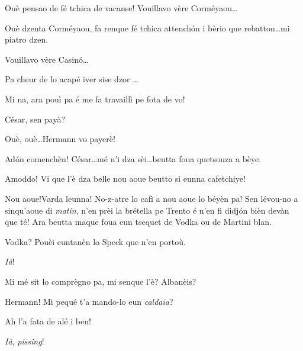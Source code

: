 \begin{drama}
\Peterspeaks{}  Ouè pensao de fé tchica de vacanse! Vouillavo vère Corméyaou\ldots

\Cesarspeaks Ouè dzenta Corméyaou, fa renque fé tchica attench\'on i bèrio que rebatton\ldots mi piatro dzen.

\Peterspeaks Vouillavo vère Casin\'o\ldots

\Cesarspeaks Pa cheur de lo acapé iver sise dzor \ldots

\Peterspeaks Mi na, ara pouì pa é me fa travaillì pe fota de vo!


\Katrinspeaks César, sen payà?

\Cesarspeaks{} Ouè, ouè\ldots Hermann vo payerè!


\Hermannspeaks Ad\'on comenchèn! César\ldots mé n'i dza sèi\ldots beutta foua quetsouza a bèye.

\Cesarspeaks Amoddo! Vi que l'è dza belle nou aoue beutto si eunna cafetchiye!

\Hermannspeaks{} Nou aoue!Varda leunna! No-z-atre lo cafì a nou aoue lo béyèn pa! Sen lévou-no a sinqu'aoue di \textit{matin}, n'en prèi la brétella pe Trento é n'en fi didj\'on bièn devàn que té! Ara beutta maque foua eun tsequet de Vodka ou de Martini blan.

\Peterspeaks {} Vodka? Pouèi euntanèn lo Speck que n'en portoù.

\Hermannspeaks \textit{Ià}!


\Cesarspeaks{} Mi mé sit lo comprègno pa, mi senque l'è? Albanèis?


\Cesarspeaks Hermann! Mi pequé t'a mando-lo eun \textit{caldaia}?


\Cesarspeaks Ah l'a fata de alé i ben!

\Hermannspeaks \textit{Ià}, \textit{pissing}!


\end{drama}
